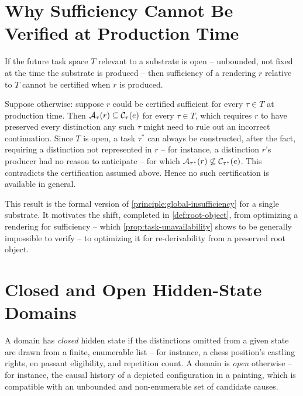 \section{Why Sufficiency Cannot Be Verified at Production Time}

\begin{proposition}
\label{prop:task-unavailability}
If the future task space $T$ relevant to a substrate is open -- unbounded,
not fixed at the time the substrate is produced -- then sufficiency of a
rendering $r$ relative to $T$ cannot be certified when $r$ is produced.
\end{proposition}

\begin{proofsketch}
Suppose otherwise: suppose $r$ could be certified sufficient for every
$\tau \in T$ at production time. Then $\mathcal{A}_{\tau}(r) \subseteq
\mathcal{C}_\tau(e)$ for every $\tau \in T$, which requires $r$ to have
preserved every distinction any such $\tau$ might need to rule out an
incorrect continuation. Since $T$ is open, a task $\tau^*$ can always be
constructed, after the fact, requiring a distinction not represented in
$r$ -- for instance, a distinction $r$'s producer had no reason to
anticipate -- for which $\mathcal{A}_{\tau^*}(r) \not\subseteq
\mathcal{C}_{\tau^*}(e)$. This contradicts the certification assumed
above. Hence no such certification is available in general.
\end{proofsketch}

This result is the formal version of \cref{principle:global-insufficiency}
for a single substrate. It motivates the shift, completed in
\cref{def:root-object}, from optimizing a rendering for sufficiency --
which \cref{prop:task-unavailability} shows to be generally impossible to
verify -- to optimizing it for re-derivability from a preserved root
object.

\section{Closed and Open Hidden-State Domains}

\begin{definition}
\label{def:closed-open}
A domain has \emph{closed} hidden state if the distinctions omitted from a
given state are drawn from a finite, enumerable list -- for instance, a
chess position's castling rights, en passant eligibility, and repetition
count. A domain is \emph{open} otherwise -- for instance, the causal
history of a depicted configuration in a painting, which is compatible
with an unbounded and non-enumerable set of candidate causes.
\end{definition}

